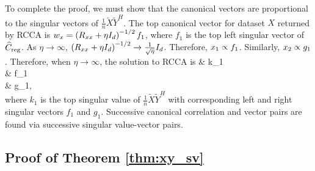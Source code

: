 To complete the proof, we must show that the canonical vectors are proportional to the
singular vectors of $\frac{1}{n}\widetilde{X}\widetilde{Y}^H$. The top
canonical vector for dataset $X$ returned by RCCA is $w_x = \left(R_{xx}+\eta
  I_d\right)^{-1/2}f_1$, where $f_1$ is the top left singular vector of $\widehat{C}_{\text{reg}}$. As
$\eta\to\infty$, $\left(R_{xx}+\eta I_d\right)^{-1/2}\to \frac{1}{\sqrt{\eta}}I_d$. Therefore,
$x_1\propto f_1$. Similarly, $x_2\propto g_1$. Therefore, when $\eta\to\infty$, the
solution to RCCA is
\be\ba
& \rho \propto k_1\\
& \xI \propto f_1\\
& \xII \propto g_1,\\
\ea\ee
where $k_1$ is the top singular value of $\frac{1}{n}\widetilde{X}\widetilde{Y}^H$ with
corresponding left and right singular vectors $f_1$ and $g_1$. Successive canonical
correlation and vector pairs are found via successive singular value-vector pairs.

\subsection{Proof of Theorem \ref{thm:xy_sv}}\label{sec:xy_sv_proof}

